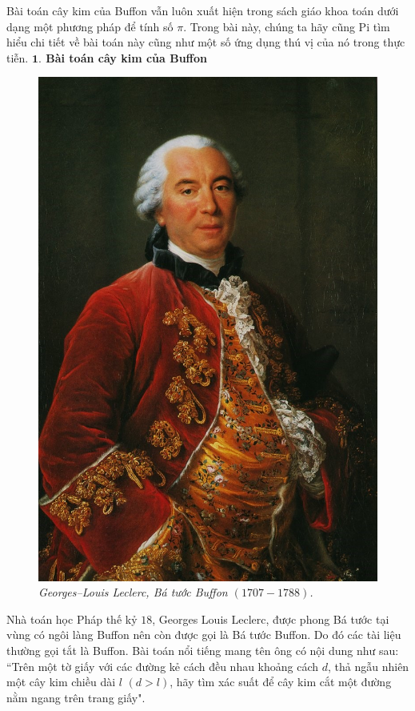 \begin{multicols}{2}
	Bài toán cây kim của Buffon vẫn luôn xuất hiện trong sách giáo khoa toán dưới dạng một phương pháp để tính số $\pi$. Trong bài này, chúng ta hãy cũng Pi tìm hiểu chi tiết về bài toán này cũng như một số ứng dụng thú vị của nó trong thực tiễn.
	\vskip 0.1cm
	\textbf{\color{toanhocdoisong}$\pmb{1.}$ Bài toán cây kim của Buffon}
	\begin{figure}[H]
		\vspace*{-5pt}
		\centering
		\captionsetup{labelformat= empty, justification=centering}
		\includegraphics[width=0.68\linewidth]{1}
		\caption{\small\textit{\color{toanhocdoisong}Georges--Louis Leclerc, Bá tước Buffon $(1707-1788)$.}}
		\vspace*{-10pt}
	\end{figure}
	Nhà toán học Pháp thế kỷ $18$, Georges Louis Leclerc, được phong Bá tước tại vùng có ngôi làng Buffon nên còn được gọi là Bá tước Buffon. Do đó các tài liệu thường gọi tắt là Buffon. Bài toán nổi tiếng mang tên ông có nội dung như sau:
	\vskip 0.1cm
	``Trên một tờ giấy với các đường kẻ cách đều nhau khoảng cách $d$, thả ngẫu nhiên một cây kim chiều dài $l$ $(d>l)$, hãy tìm xác suất để cây kim cắt một đường nằm ngang trên trang giấy".
	\begin{figure}[H]
		\vspace*{-5pt}

\end{figure}
\end{multicols}
